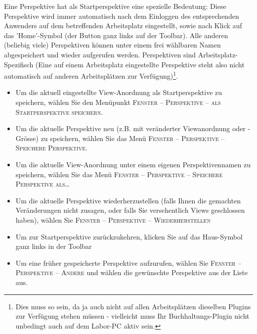 Eine Perspektive hat als \glqq Startperspektive\grqq{} eine spezielle Bedeutung:
Diese Perspektive wird immer automatisch nach dem Einloggen des entsprechenden
Anwenders auf dem betreffenden Arbeitsplatz eingestellt, sowie nach Klick auf das
'Home'-Symbol (der Button ganz links auf der Toolbar). Alle anderen (beliebig
viele) Perspektiven können unter einem frei wählbaren Namen abgespeichert und
wieder aufgerufen werden. Perspektiven sind Arbeitsplatz-Spezifisch (Eine auf
einem Arbeitsplatz eingestellte Perspektive steht also nicht automatisch auf
anderen Arbeitsplätzen zur Verfügung)\footnote{Dies muss so sein, da ja auch
nicht auf allen Arbeitsplätzen dieselben Plugins zur Verfügung stehen müssen -
vielleicht muss Ihr Buchhaltungs-Plugin nicht unbedingt auch auf dem Labor-PC
aktiv sein.}.

\begin{itemize}
\item Um die aktuell eingestellte View-Anordnung als Startperspektive zu
speichern,
wählen Sie den Menüpunkt \textsc{Fenster -- Perspektive -- als Startperspektive
speichern}.

\item Um die aktuelle Perspektive neu (z.B. mit veränderter Viewanordnung oder
-Grösse) zu speichern, wählen Sie das Menü \textsc{Fenster -- Perspektive --
Speichere Perspektive}.

\item Um die aktuelle View-Anordnung unter einem eigenen Perspektivennamen
zu speichern, wählen Sie das  Menü \textsc{Fenster -- Perspektive -- Speichere Perspektive als\ldots}

\item Um die aktuelle Perspektive wiederherzustellen (falls Ihnen die gemachten
Ver\-än\-de\-run\-gen nicht zusagen, oder falls Sie versehentlich Views geschlossen
haben), wählen Sie \textsc{Fenster -- Perspektive -- Wiederherstellen}

\item Um zur Startperspektive zurückzukehren, klicken Sie auf das Haus-Symbol
ganz links in der Toolbar
\item Um eine früher gespeicherte Perspektive aufzurufen, wählen Sie
\textsc{Fenster -- Perspektive -- Andere} und wählen die gewünschte Perspektive
aus der Liste aus.

\end{itemize}
